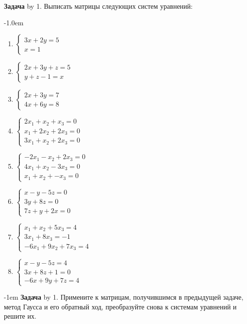\documentclass[a4paper,10pt]{article}
\def\problem{\textbf{Задача \the\problemnum}\advance\problemnum by 1}
\begin{document}
{\problem. Выписать матрицы следующих систем уравнений: \par\kern-1.0em

\begin{multicols}{4}
	\begin{enumerate}[label=(\arabic*)\,]
		\item 
$\begin{cases}
    3x + 2y = 5 \\
    x  = 1
\end{cases}$
		\item 
$\begin{cases}
    2x + 3y + z = 5 \\
    y+z-1  = x
\end{cases}$
		\item 
$\begin{cases}
    2x + 3y = 7 \\
    4x + 6y = 8
\end{cases}$
		\item 
$\begin{cases}
    2x_1 + x_2 + x_3 = 0 \\
    x_1 + 2x_2 + 2x_3 =0 \\
    3x_1 + x_2 + 2x_3 = 0
\end{cases}$
		\item 
$\begin{cases}
    -2x_1 - x_2 + 2x_3 = 0 \\
    4x_1 + x_2 -3x_3 =0 \\
    x_1 + x_2 + -x_3 = 0
\end{cases}$
		\item 
$\begin{cases}
    x -y -5z =0\\
    3y + 8z=0 \\
    7z +y +2x=0
\end{cases}$
		\item 
$\begin{cases}
    x_1 + x_2 + 5x_3 = 4 \\
    3x_1+ 8x_3 =-1 \\
    -6x_1 +9x_2 +7x_3 = 4
\end{cases}$
		\item 
$\begin{cases}
    x  -y  -5z = 4 \\
    3x + 8z + 1=0 \\
    -6x + 9y + 7z = 4
\end{cases}$
	\end{enumerate}
\end{multicols}\par\kern-1em
\problem. Примените к матрицам, получившимся в предыдущей задаче, метод Гаусса и его обратный ход, преобразуйте снова к системам уравнений и решите их.}
\end{document}
